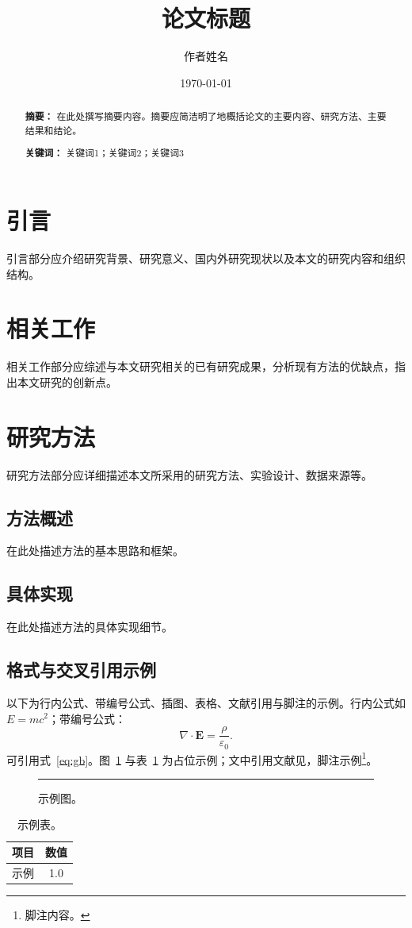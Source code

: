 \documentclass[12pt,a4paper]{article}
\title{论文标题}
\author{作者姓名}
\date{\today}
\begin{document}
\maketitle

\begin{abstract}
\textbf{摘要：} 在此处撰写摘要内容。摘要应简洁明了地概括论文的主要内容、研究方法、主要结果和结论。

\textbf{关键词：} 关键词1；关键词2；关键词3
\end{abstract}

\tableofcontents
\newpage

\section{引言}
引言部分应介绍研究背景、研究意义、国内外研究现状以及本文的研究内容和组织结构。

\section{相关工作}
相关工作部分应综述与本文研究相关的已有研究成果，分析现有方法的优缺点，指出本文研究的创新点。

\section{研究方法}
研究方法部分应详细描述本文所采用的研究方法、实验设计、数据来源等。

\subsection{方法概述}
在此处描述方法的基本思路和框架。

\subsection{具体实现}
在此处描述方法的具体实现细节。

\subsection{格式与交叉引用示例}
以下为行内公式、带编号公式、插图、表格、文献引用与脚注的示例。行内公式如 $E=mc^2$；带编号公式：
\begin{equation}
  \label{eq:gb}
  \nabla \cdot \mathbf{E} = \frac{\rho}{\varepsilon_0}.
\end{equation}
可引用式~\ref{eq:gb}。图~\ref{fig:gb} 与表~\ref{tab:gb} 为占位示例；文中引用文献见\cite{ref1}，脚注示例\footnote{脚注内容。}。
\begin{figure}[htbp]
  \centering
  \rule{3.5cm}{2cm}
  \caption{示例图。}
  \label{fig:gb}
\end{figure}
\begin{table}[htbp]
  \centering
  \caption{示例表。}
  \label{tab:gb}
  \begin{tabular}{lc}
    \toprule
    项目 & 数值 \\
    \midrule
    示例 & 1.0  \\
    \bottomrule
  \end{tabular}
\end{table}
\end{document}
